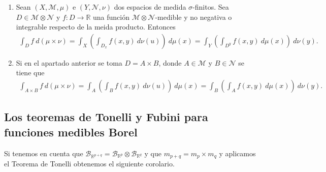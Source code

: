 \begin{obs}
    \begin{enumerate}
        \item Sean $(X, \mathcal{M}, \mu)$ e $(Y, \mathcal{N}, \nu)$ dos espacios de medida $\sigma$-finitos. Sea $D \in \mathcal{M} \otimes \mathcal{N}$ y $f: D \longrightarrow \mathbb{R}$ una función $\mathcal{M} \otimes \mathcal{N}$-medible y no negativa o integrable respecto de la meida producto. Entonces
              \begin{align*}
                  \int_{D}{f \ d(\mu \times \nu)} = \int_{X}\left( \int_{D_x}{f(x,y) \ d\nu(u)}\right) \ d\mu(x) = \int_{Y}\left( \int_{D^y}{f(x,y) \ d\mu(x)}\right) \ d\nu(y).
              \end{align*}
        \item Si en el apartado anterior se toma $D = A \times B$, donde $A \in \mathcal{M}$ y $B \in \mathcal{N}$ se tiene que
              \begin{align*}
                  \int_{A\times B}{f \ d(\mu \times \nu)} = \int_{A}\left( \int_{B}{f(x,y) \ d\nu(u)}\right) \ d\mu(x) = \int_{B}\left( \int_{A}{f(x,y) \ d\mu(x)}\right) \ d\nu(y).
              \end{align*}
    \end{enumerate}
\end{obs}

\subsection{Los teoremas de Tonelli y Fubini para funciones medibles Borel}

Si tenemos en cuenta que $\mathcal{B}_{\mathbb{R}^{p+q}} = \mathcal{B}_{\mathbb{R}^{p}} \otimes \mathcal{B}_{\mathbb{R}^{q}}$ y que $m_{p+q} = m_p \times m_q$ y aplicamos el Teorema de Tonelli obtenemos el siguiente corolario.

